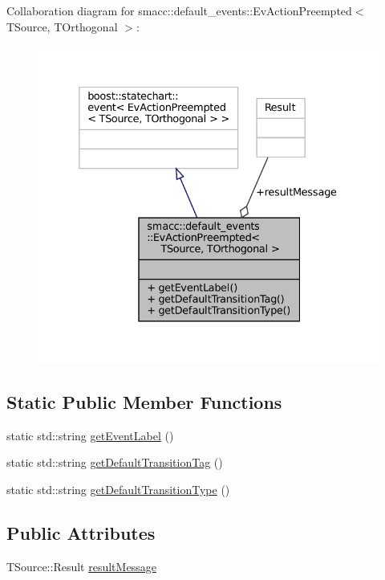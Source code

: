 Collaboration diagram for smacc\+:\+:default\+\_\+events\+:\+:Ev\+Action\+Preempted$<$ T\+Source, T\+Orthogonal $>$\+:
\nopagebreak
\begin{figure}[H]
\begin{center}
\leavevmode
\includegraphics[width=332pt]{structsmacc_1_1default__events_1_1EvActionPreempted__coll__graph}
\end{center}
\end{figure}
\subsection*{Static Public Member Functions}
\begin{DoxyCompactItemize}
\item 
static std\+::string \hyperlink{structsmacc_1_1default__events_1_1EvActionPreempted_a18ec7c245789fe0571a70ae7cc65be18}{get\+Event\+Label} ()
\item 
static std\+::string \hyperlink{structsmacc_1_1default__events_1_1EvActionPreempted_aaa13306be922de1d5602899b47bf71be}{get\+Default\+Transition\+Tag} ()
\item 
static std\+::string \hyperlink{structsmacc_1_1default__events_1_1EvActionPreempted_ab2c4d784d7e56d72b8b7daba356d2099}{get\+Default\+Transition\+Type} ()
\end{DoxyCompactItemize}
\subsection*{Public Attributes}
\begin{DoxyCompactItemize}
\item 
T\+Source\+::\+Result \hyperlink{structsmacc_1_1default__events_1_1EvActionPreempted_a07cab331973c3f9ffbac697d6c2f6f91}{result\+Message}
\end{DoxyCompactItemize}


